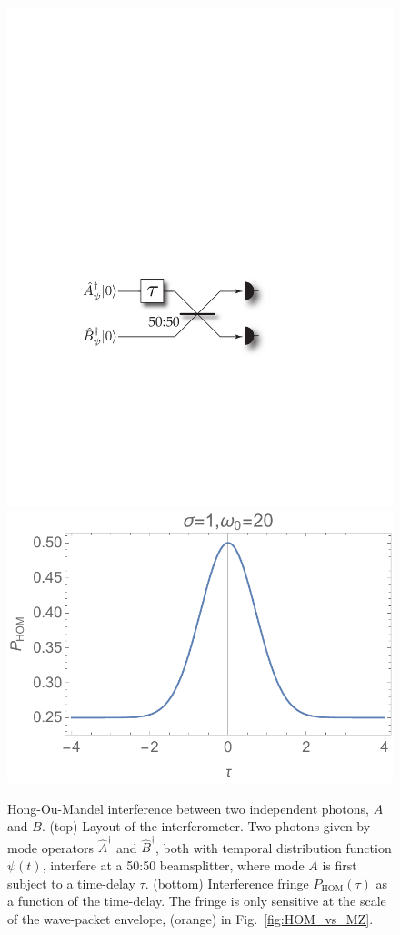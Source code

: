 \documentclass[aps,rmp,twocolumn,amsmath,amssymb,nofootinbib,superscriptaddress,longbibliography,floatfix,table-of-contents,eqsecnum]{revtex4-1}
\begin{document}
\begin{figure}[!htb]
	\includegraphics[width=0.65\columnwidth]{HOM_setup} \\
	\includegraphics[width=\columnwidth]{HOM}
	\caption{Hong-Ou-Mandel interference between two independent photons, $A$ and $B$. (top) Layout of the interferometer. Two photons given by mode operators $\hat{A}^\dag$ and $\hat{B}^\dag$, both with temporal distribution function $\psi(t)$, interfere at a 50:50 beamsplitter, where mode $A$ is first subject to a time-delay $\tau$. (bottom) Interference fringe $P_\text{HOM}(\tau)$ as a function of the time-delay. The fringe is only sensitive at the scale of the wave-packet envelope, (orange) in Fig.~\ref{fig:HOM_vs_MZ}.} \label{fig:HOM_inter}
\end{figure}
\end{document}
